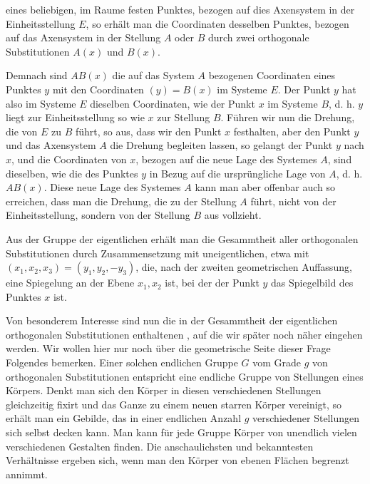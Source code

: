 eines beliebigen, im Raume festen Punktes, bezogen auf dies
Axensystem in der Einheitsstellung $E$, so erh\"alt man die Coordinaten desselben Punktes, bezogen auf das Axensystem in der
Stellung $A$ oder $B$ durch zwei orthogonale Substitutionen $A(x)$
und $B(x)$.

Demnach sind $AB(x)$ die auf das System $A$ bezogenen
Coordinaten eines Punktes $y$ mit den Coordinaten $(y) = B(x)$
im Systeme $E$. Der Punkt $y$ hat also im Systeme $E$ dieselben
Coordinaten, wie der Punkt $x$ im Systeme $B$, d. h. $y$ liegt zur
Einheitsstellung so wie $x$ zur Stellung $B$. F\"uhren wir nun die
Drehung, die von $E$ zu $B$ f\"uhrt, so aus, dass wir den Punkt $x$
festhalten, aber den Punkt $y$ und das Axensystem $A$ die Drehung
begleiten lassen, so gelangt der Punkt $y$ nach $x$, und die Coordinaten von $x$, bezogen auf die neue Lage des Systemes $A$, sind
dieselben, wie die des Punktes $y$ in Bezug auf die urspr\"ungliche
Lage von $A$, d. h. $AB(x)$. Diese neue Lage des Systemes $A$
kann man aber offenbar auch so erreichen, dass man die Drehung,
die zu der Stellung $A$ f\"uhrt, nicht von der Einheitsstellung,
sondern von der Stellung $B$ aus vollzieht.

Aus der Gruppe der eigentlichen erh\"alt man die Gesammtheit
aller orthogonalen Substitutionen durch Zusammensetzung mit
 uneigentlichen, etwa mit $(x_1, x_2, x_3) = (y_1, y_2, - y_3)$,
die, nach der zweiten geometrischen Auffassung, eine Spiegelung
an der Ebene $x_1, x_2$ ist, bei der der Punkt $y$ das Spiegelbild
des Punktes $x$ ist.

Von besonderem Interesse sind nun die in der Gesammtheit
der eigentlichen orthogonalen Substitutionen enthaltenen , auf die wir sp\"ater noch n\"aher eingehen werden.
Wir wollen hier nur noch \"uber die geometrische Seite dieser
Frage Folgendes bemerken. Einer solchen endlichen Gruppe $G$
vom Grade $g$ von orthogonalen Substitutionen entspricht eine
endliche Gruppe von Stellungen eines K\"orpers. Denkt man sich
den K\"orper in diesen verschiedenen Stellungen gleichzeitig fixirt
und das Ganze zu einem neuen starren K\"orper vereinigt, so
erh\"alt man ein Gebilde, das in einer endlichen Anzahl $g$ verschiedener Stellungen sich selbst decken kann. Man kann f\"ur
jede Gruppe K\"orper von unendlich vielen verschiedenen Gestalten
finden. Die anschaulichsten und bekanntesten Verh\"altnisse ergeben sich, wenn man den K\"orper von ebenen Fl\"achen begrenzt
annimmt.
